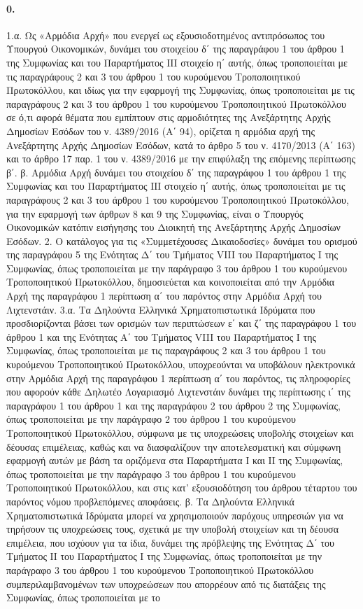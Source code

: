 \documentclass[a4paper,oneside, 10pt]{book}
\begin{document}
\paragraph { 0. }  1.α. Ως «Αρμόδια Αρχή» που ενεργεί ως εξουσιοδοτημένος αντιπρόσωπος του Υπουργού Οικονομικών, δυνάμει του στοιχείου δ΄ της παραγράφου 1 του άρθρου 1 της Συμφωνίας και του Παραρτήματος ΙΙΙ στοιχείο η΄ αυτής, όπως τροποποιείται με τις παραγράφους 2 και 3 του άρθρου 1 του κυρούμενου Τροποποιητικού Πρωτοκόλλου, και ιδίως για την εφαρμογή της Συμφωνίας, όπως τροποποιείται με τις παραγράφους 2 και 3 του άρθρου 1 του κυρούμενου Τροποποιητικού Πρωτοκόλλου σε ό,τι αφορά θέματα που εμπίπτουν στις αρμοδιότητες της Ανεξάρτητης Αρχής Δημοσίων Εσόδων του ν. 4389/2016 (Α΄ 94), ορίζεται η αρμόδια αρχή της Ανεξάρτητης Αρχής Δημοσίων Εσόδων, κατά το άρθρο 5 του ν. 4170/2013 (Α΄ 163) και το άρθρο 17 παρ. 1 του ν. 4389/2016 με την επιφύλαξη της επόμενης περίπτωσης β΄.  β. Αρμόδια Αρχή δυνάμει του στοιχείου δ΄ της παραγράφου 1 του άρθρου 1 της Συμφωνίας και του Παραρτήματος ΙΙΙ στοιχείο η΄ αυτής, όπως τροποποιείται με τις παραγράφους 2 και 3 του άρθρου 1 του κυρούμενου Τροποποιητικού Πρωτοκόλλου, για την εφαρμογή των άρθρων 8 και 9 της Συμφωνίας, είναι ο Υπουργός Οικονομικών κατόπιν εισήγησης του Διοικητή της Ανεξάρτητης Αρχής Δημοσίων Εσόδων.  2. Ο κατάλογος για τις «Συμμετέχουσες Δικαιοδοσίες» δυνάμει του ορισμού της παραγράφου 5 της Ενότητας Δ΄ του Τμήματος VIII του Παραρτήματος Ι της Συμφωνίας, όπως τροποποιείται με την παράγραφο 3 του άρθρου 1 του κυρούμενου Τροποποιητικού Πρωτοκόλλου, δημοσιεύεται και κοινοποιείται από την Αρμόδια Αρχή της παραγράφου 1 περίπτωση α΄ του παρόντος στην Αρμόδια Αρχή του Λιχτενστάιν.  3.α. Τα Δηλούντα Ελληνικά Χρηματοπιστωτικά Ιδρύματα που προσδιορίζονται βάσει των ορισμών των περιπτώσεων ε΄ και ζ΄ της παραγράφου 1 του άρθρου 1 και της Ενότητας Α΄ του Τμήματος VIII του Παραρτήματος Ι της Συμφωνίας, όπως τροποποιείται με τις παραγράφους 2 και 3 του άρθρου 1 του κυρούμενου Τροποποιητικού Πρωτοκόλλου, υποχρεούνται να υποβάλουν ηλεκτρονικά στην Αρμόδια Αρχή της παραγράφου 1 περίπτωση α΄ του παρόντος, τις πληροφορίες που αφορούν κάθε Δηλωτέο Λογαριασμό Λιχτενστάιν δυνάμει της περίπτωσης ι΄ της παραγράφου 1 του άρθρου 1 και της παραγράφου 2 του άρθρου 2 της Συμφωνίας, όπως τροποποιείται με την παράγραφο 2 του άρθρου 1 του κυρούμενου Τροποποιητικού Πρωτοκόλλου, σύμφωνα με τις υποχρεώσεις υποβολής στοιχείων και δέουσας επιμέλειας, καθώς και να διασφαλίζουν την αποτελεσματική και σύμφωνη εφαρμογή αυτών με βάση τα οριζόμενα στα Παραρτήματα Ι και ΙΙ της Συμφωνίας, όπως τροποποιείται με την παράγραφο 3 του άρθρου 1 του κυρούμενου Τροποποιητικού Πρωτοκόλλου, και στις κατ’ εξουσιοδότηση του άρθρου τέταρτου του παρόντος νόμου προβλεπόμενες αποφάσεις.  β. Τα Δηλούντα Ελληνικά Χρηματοπιστωτικά Ιδρύματα μπορεί να χρησιμοποιούν παρόχους υπηρεσιών για να τηρήσουν τις υποχρεώσεις τους, σχετικά με την υποβολή στοιχείων και τη δέουσα επιμέλεια, που ισχύουν  για τα ίδια, δυνάμει της πρόβλεψης της Ενότητας Δ΄ του Τμήματος ΙΙ του Παραρτήματος Ι της Συμφωνίας, όπως τροποποιείται με την παράγραφο 3 του άρθρου 1 του κυρούμενου Τροποποιητικού Πρωτοκόλλου συμπεριλαμβανομένων των υποχρεώσεων που απορρέουν από τις διατάξεις της Συμφωνίας, όπως τροποποιείται με το 
\end{document}
